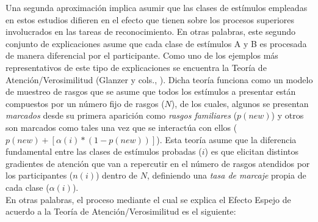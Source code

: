 Una segunda aproximación implica asumir que las clases de estímulos empleadas en estos estudios difieren en el efecto que tienen sobre los procesos superiores involucrados en las tareas de reconocimiento. En otras palabras, este segundo conjunto de explicaciones asume que cada clase de estímulos A y B es procesada de manera diferencial por el participante. Como uno de los ejemplos más representativos de este tipo de explicaciones se encuentra la Teoría de Atención/Verosimilitud (Glanzer y cols., \citeyear{Glanzer1993}). Dicha teoría funciona como un modelo de muestreo de rasgos que se asume que todos los estímulos a presentar están compuestos por un número fijo de rasgos ($N$), de los cuales, algunos se presentan \textit{marcados} desde su primera aparición como \textit{rasgos familiares} ($p(new)$) y otros son marcados como tales una vez que se interactúa con ellos ($p(new) + [\alpha(i)* (1-p(new))]$). Esta teoría asume que la diferencia fundamental entre  las clases de estímulos probadas ($i$) es que elicitan distintos gradientes de atención que van a repercutir en el número de rasgos atendidos por los participantes ($n(i)$) dentro de $N$, definiendo una \textit{tasa de marcaje} propia de cada clase ($\alpha(i)$).\\

En otras palabras, el proceso mediante el cual se explica el Efecto Espejo de acuerdo a la Teoría de Atención/Verosimilitud es el siguiente:\\

